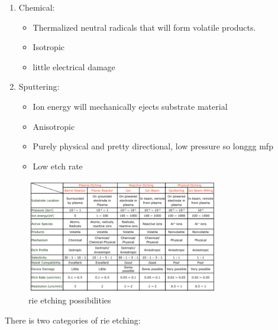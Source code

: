 \documentclass[
]{article}
\begin{document}
\begin{enumerate}
\def\labelenumi{\arabic{enumi}.}
\item
  Chemical:

  \begin{itemize}
  \item
    Thermalized neutral radicals that will form volatile products.
  \item
    Isotropic
  \item
    little electrical damage
  \end{itemize}
\item
  Sputtering:

  \begin{itemize}
  \item
    Ion energy will mechanically ejects substrate material
  \item
    Anisotropic
  \item
    Purely physical and pretty directional, low pressure so longgg {mfp}
  \item
    Low etch rate
  \end{itemize}
\end{enumerate}

\begin{figure}
\hypertarget{fig:enter-label}{%
\centering
\includegraphics[width=0.75\textwidth,height=\textheight]{rie_etching_possibilities.png}
\caption{{rie} etching possibilities}\label{fig:enter-label}
}
\end{figure}

There is two categories of {rie} etching:
\end{document}
